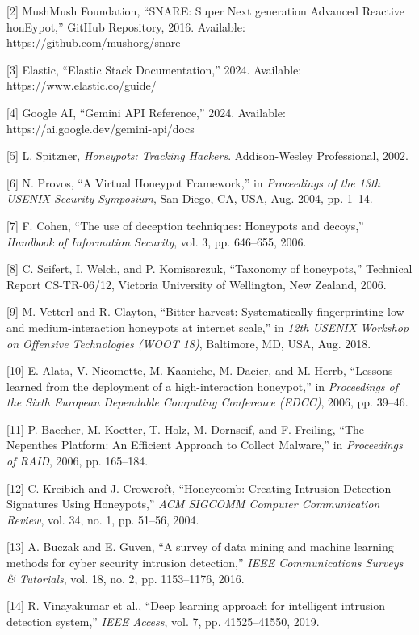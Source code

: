 \documentclass[12pt,a4paper]{report}
\begin{document}
[2] MushMush Foundation, ``SNARE: Super Next generation Advanced Reactive honEypot,'' GitHub Repository, 2016. Available: https://github.com/mushorg/snare

[3] Elastic, ``Elastic Stack Documentation,'' 2024. Available: https://www.elastic.co/guide/

[4] Google AI, ``Gemini API Reference,'' 2024. Available: https://ai.google.dev/gemini-api/docs

[5] L. Spitzner, \textit{Honeypots: Tracking Hackers}. Addison-Wesley Professional, 2002.

[6] N. Provos, ``A Virtual Honeypot Framework,'' in \textit{Proceedings of the 13th USENIX Security Symposium}, San Diego, CA, USA, Aug. 2004, pp. 1--14.

[7] F. Cohen, ``The use of deception techniques: Honeypots and decoys,'' \textit{Handbook of Information Security}, vol. 3, pp. 646--655, 2006.

[8] C. Seifert, I. Welch, and P. Komisarczuk, ``Taxonomy of honeypots,'' Technical Report CS-TR-06/12, Victoria University of Wellington, New Zealand, 2006.

[9] M. Vetterl and R. Clayton, ``Bitter harvest: Systematically fingerprinting low- and medium-interaction honeypots at internet scale,'' in \textit{12th USENIX Workshop on Offensive Technologies (WOOT 18)}, Baltimore, MD, USA, Aug. 2018.

[10] E. Alata, V. Nicomette, M. Kaaniche, M. Dacier, and M. Herrb, ``Lessons learned from the deployment of a high-interaction honeypot,'' in \textit{Proceedings of the Sixth European Dependable Computing Conference (EDCC)}, 2006, pp. 39--46.

[11] P. Baecher, M. Koetter, T. Holz, M. Dornseif, and F. Freiling, ``The Nepenthes Platform: An Efficient Approach to Collect Malware,'' in \textit{Proceedings of RAID}, 2006, pp. 165--184.

[12] C. Kreibich and J. Crowcroft, ``Honeycomb: Creating Intrusion Detection Signatures Using Honeypots,'' \textit{ACM SIGCOMM Computer Communication Review}, vol. 34, no. 1, pp. 51--56, 2004.

[13] A. Buczak and E. Guven, ``A survey of data mining and machine learning methods for cyber security intrusion detection,'' \textit{IEEE Communications Surveys \& Tutorials}, vol. 18, no. 2, pp. 1153--1176, 2016.

[14] R. Vinayakumar et al., ``Deep learning approach for intelligent intrusion detection system,'' \textit{IEEE Access}, vol. 7, pp. 41525--41550, 2019.
\end{document}
